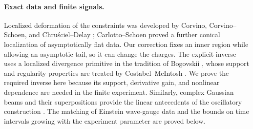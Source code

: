 \paragraph{Exact data and finite signals.}
Localized deformation of the constraints was developed by Corvino,
Corvino--Schoen, and Chru\'sciel--Delay
\cite{Corvino2000,CorvinoSchoen2006,ChruscielDelay2003};
Carlotto--Schoen \cite{CarlottoSchoen2016} proved a further conical
localization of asymptotically flat data. Our correction fixes an inner
region while allowing an asymptotic tail, so it can change the charges.
The explicit inverse uses a localized divergence primitive in the
tradition of Bogovskii \cite{Bogovskii1980}, whose support and regularity
properties are treated by Costabel--McIntosh
\cite{CostabelMcIntosh2010}. We prove the required inverse here because its
support, derivative gain, and nonlinear dependence are needed in the
finite experiment. Similarly, complex Gaussian beams and their
superpositions provide the linear antecedents of the oscillatory
construction \cite{Ralston1982,Tanushev2008,LiuRunborgTanushev2013}.
The matching of Einstein wave-gauge data and the bounds on time
intervals growing with the experiment parameter are proved below.

